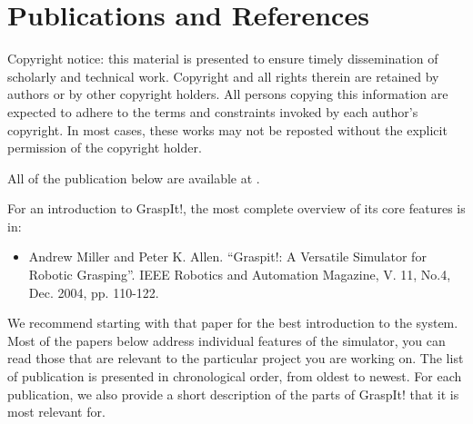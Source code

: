 \section{Publications and References}
\label{sec:publications}

Copyright notice: this material is presented to ensure timely
dissemination of scholarly and technical work. Copyright and all
rights therein are retained by authors or by other copyright
holders. All persons copying this information are expected to adhere
to the terms and constraints invoked by each author's copyright. In
most cases, these works may not be reposted without the explicit
permission of the copyright holder.

All of the publication below are available at
.

For an introduction to GraspIt!, the most complete overview of its
core features is in:
\begin{itemize}
\item Andrew Miller and Peter K. Allen. ``Graspit!: A Versatile
  Simulator for Robotic Grasping''. IEEE Robotics and Automation
  Magazine, V. 11, No.4, Dec. 2004, pp. 110-122.
\end{itemize}

We recommend starting with that paper for the best introduction to the
system. Most of the papers below address individual features of the
simulator, you can read those that are relevant to the particular
project you are working on. The list of publication is presented in
chronological order, from oldest to newest. For each publication, we
also provide a short description of the parts of GraspIt! that it is
most relevant for.

